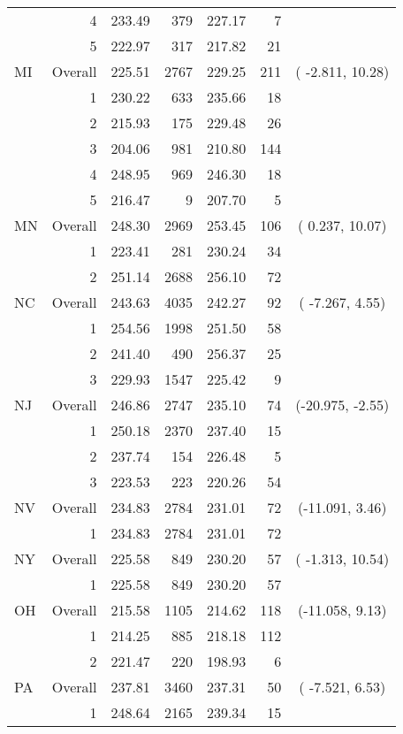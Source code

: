 \begin{longtable}{lrrr@{\extracolsep{.25cm}}rrc}
   & 4 & 233.49 & 379 & 227.17 &   7 &  \\ 
   & 5 & 222.97 & 317 & 217.82 &  21 &  \\ 
   \hline
MI & Overall & 225.51 & 2767 & 229.25 & 211 & ( -2.811, 10.28) \\ 
   & 1 & 230.22 & 633 & 235.66 &  18 &  \\ 
   & 2 & 215.93 & 175 & 229.48 &  26 &  \\ 
   & 3 & 204.06 & 981 & 210.80 & 144 &  \\ 
   & 4 & 248.95 & 969 & 246.30 &  18 &  \\ 
   & 5 & 216.47 &   9 & 207.70 &   5 &  \\ 
   \hline
MN & Overall & 248.30 & 2969 & 253.45 & 106 & (  0.237, 10.07) \\ 
   & 1 & 223.41 & 281 & 230.24 &  34 &  \\ 
   & 2 & 251.14 & 2688 & 256.10 &  72 &  \\ 
   \hline
NC & Overall & 243.63 & 4035 & 242.27 &  92 & ( -7.267,  4.55) \\ 
   & 1 & 254.56 & 1998 & 251.50 &  58 &  \\ 
   & 2 & 241.40 & 490 & 256.37 &  25 &  \\ 
   & 3 & 229.93 & 1547 & 225.42 &   9 &  \\ 
   \hline
NJ & Overall & 246.86 & 2747 & 235.10 &  74 & (-20.975, -2.55) \\ 
   & 1 & 250.18 & 2370 & 237.40 &  15 &  \\ 
   & 2 & 237.74 & 154 & 226.48 &   5 &  \\ 
   & 3 & 223.53 & 223 & 220.26 &  54 &  \\ 
   \hline
NV & Overall & 234.83 & 2784 & 231.01 &  72 & (-11.091,  3.46) \\ 
   & 1 & 234.83 & 2784 & 231.01 &  72 &  \\ 
   \hline
NY & Overall & 225.58 & 849 & 230.20 &  57 & ( -1.313, 10.54) \\ 
   & 1 & 225.58 & 849 & 230.20 &  57 &  \\ 
   \hline
OH & Overall & 215.58 & 1105 & 214.62 & 118 & (-11.058,  9.13) \\ 
   & 1 & 214.25 & 885 & 218.18 & 112 &  \\ 
   & 2 & 221.47 & 220 & 198.93 &   6 &  \\ 
   \hline
PA & Overall & 237.81 & 3460 & 237.31 &  50 & ( -7.521,  6.53) \\ 
   & 1 & 248.64 & 2165 & 239.34 &  15 &  \\ 

\end{longtable}

